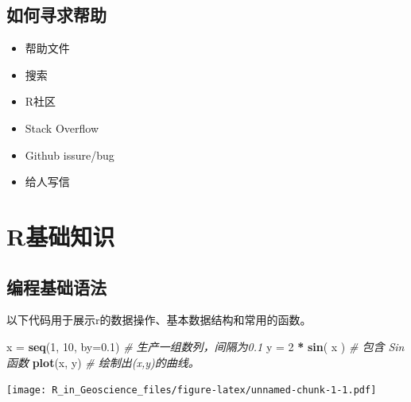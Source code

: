 \documentclass[]{scrbook}
\newenvironment{Shaded}{\begin{snugshade}}{\end{snugshade}}
\newcommand{\CommentTok}[1]{\textcolor[rgb]{0.56,0.35,0.01}{\textit{#1}}}
\newcommand{\DataTypeTok}[1]{\textcolor[rgb]{0.13,0.29,0.53}{#1}}
\newcommand{\DecValTok}[1]{\textcolor[rgb]{0.00,0.00,0.81}{#1}}
\newcommand{\FloatTok}[1]{\textcolor[rgb]{0.00,0.00,0.81}{#1}}
\newcommand{\KeywordTok}[1]{\textcolor[rgb]{0.13,0.29,0.53}{\textbf{#1}}}
\newcommand{\NormalTok}[1]{#1}
\newcommand{\OperatorTok}[1]{\textcolor[rgb]{0.81,0.36,0.00}{\textbf{#1}}}
\newcommand{\StringTok}[1]{\textcolor[rgb]{0.31,0.60,0.02}{#1}}
\begin{document}
\hypertarget{ux5982ux4f55ux5bfbux6c42ux5e2eux52a9}{%
\section{如何寻求帮助}\label{ux5982ux4f55ux5bfbux6c42ux5e2eux52a9}}

\begin{itemize}
\item
  帮助文件
\item
  搜索
\item
  R社区
\item
  Stack Overflow
\item
  Github issure/bug
\item
  给人写信
\end{itemize}

\hypertarget{basic}{%
\chapter{R基础知识}\label{basic}}

\hypertarget{ux7f16ux7a0bux57faux7840ux8bedux6cd5}{%
\section{编程基础语法}\label{ux7f16ux7a0bux57faux7840ux8bedux6cd5}}

以下代码用于展示r的数据操作、基本数据结构和常用的函数。

\begin{Shaded}
\begin{Highlighting}[]
\NormalTok{x =}\StringTok{ }\KeywordTok{seq}\NormalTok{(}\DecValTok{1}\NormalTok{, }\DecValTok{10}\NormalTok{, }\DataTypeTok{by=}\FloatTok{0.1}\NormalTok{)  }\CommentTok{\# 生产一组数列，间隔为0.1}
\NormalTok{y =}\StringTok{ }\DecValTok{2} \OperatorTok{*}\StringTok{ }\KeywordTok{sin}\NormalTok{( x )      }\CommentTok{\# 包含 Sin 函数}
\KeywordTok{plot}\NormalTok{(x, y)      }\CommentTok{\# 绘制出(x,y)的曲线。}
\end{Highlighting}
\end{Shaded}

\texttt{[image: R\_in\_Geoscience\_files/figure-latex/unnamed-chunk-1-1.pdf]}
\end{document}
